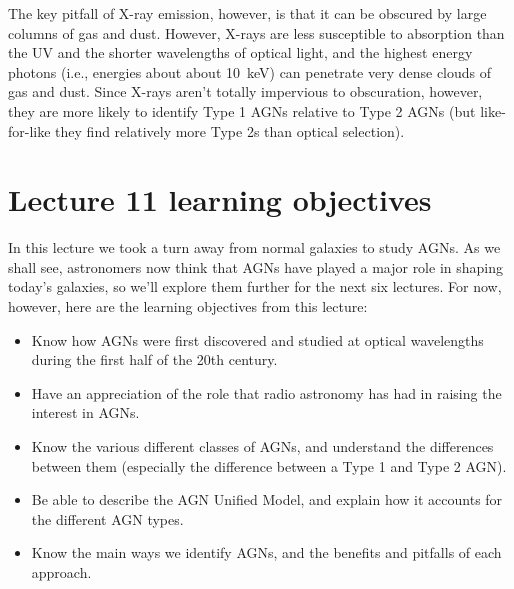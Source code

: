 \documentclass[11pt]{article}
\begin{document}
The key pitfall of X-ray emission, however, is that it can be obscured
by large columns of gas and dust. However, X-rays are less susceptible
to absorption than the UV and the shorter wavelengths of optical
light, and the highest energy photons (i.e., energies about about
10~keV) can penetrate very dense clouds of gas and dust. Since X-rays
aren't totally impervious to obscuration, however, they are more
likely to identify Type 1 AGNs relative to Type 2 AGNs (but
like-for-like they find relatively more Type 2s than optical selection).

\section{Lecture 11 learning objectives}
In this lecture we took a turn away from normal galaxies to study
AGNs. As we shall see, astronomers now think that AGNs have played a
major role in shaping today's galaxies, so we'll explore them further
for the next six lectures. For now, however, here are the learning
objectives from this lecture:
\begin{itemize}
\item Know how AGNs were first discovered and studied at optical
  wavelengths during the first half of the 20th century.
\item Have an appreciation of the role that radio astronomy has had in
  raising the interest in AGNs.
\item Know the various different classes of AGNs, and understand the
  differences between them (especially the difference between a Type 1
  and Type 2 AGN).
\item Be able to describe the AGN Unified Model, and explain how it
  accounts for the different AGN types.
\item Know the main ways we identify AGNs, and the benefits and
  pitfalls of each approach.
\end{itemize}
\end{document}

